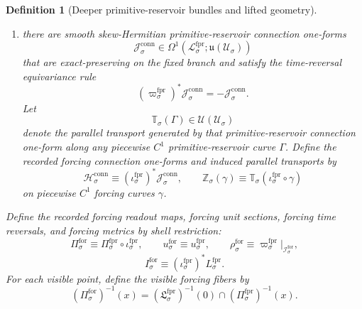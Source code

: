 \documentclass[11pt]{article}
\newcommand{\LieU}{\mathfrak u}
\newcommand{\RootClass}[1]{\mathscr U_{#1}}
\newcommand{\ForSpace}[1]{\mathcal I_{#1}^{\mathrm{for}}}
\newcommand{\ForRead}[1]{\Pi_{#1}^{\mathrm{for}}}
\newcommand{\ForUnit}[1]{u_{#1}^{\mathrm{for}}}
\newcommand{\ForTimeRev}[1]{\rho_{#1}^{\mathrm{for}}}
\newcommand{\ForMetric}[1]{I_{#1}^{\mathrm{for}}}
\newcommand{\ForLiouville}[1]{\boldsymbol{\Lambda}_{#1}^{\mathrm{for}}}
\newcommand{\ForTwo}[1]{\boldsymbol{\Xi}_{#1}^{\mathrm{for}}}
\newcommand{\ForConnectionForm}[1]{\mathcal H_{#1}^{\mathrm{conn}}}
\newcommand{\ForTransport}[1]{\mathbb Z_{#1}}
\newcommand{\ForPrimSpace}[1]{\mathcal L_{#1}^{\mathrm{fpr}}}
\newcommand{\ForPrimRead}[1]{\Pi_{#1}^{\mathrm{fpr}}}
\newcommand{\ForPrimUnit}[1]{u_{#1}^{\mathrm{fpr}}}
\newcommand{\ForPrimTimeRev}[1]{\varpi_{#1}^{\mathrm{fpr}}}
\newcommand{\ForPrimMetric}[1]{L_{#1}^{\mathrm{fpr}}}
\newcommand{\ForPrimSection}[1]{\mathfrak L_{#1}^{\mathrm{fpr}}}
\newcommand{\ForPrimInc}[1]{\iota_{#1}^{\mathrm{fpr}}}
\newcommand{\ForPrimLiouville}[1]{\boldsymbol{\Lambda}_{#1}^{\mathrm{fpr}}}
\newcommand{\ForPrimTwo}[1]{\boldsymbol{\Xi}_{#1}^{\mathrm{fpr}}}
\newcommand{\ForPrimConnectionForm}[1]{\mathcal J_{#1}^{\mathrm{conn}}}
\newcommand{\ForPrimTransport}[1]{\mathbb T_{#1}}
\newtheorem{definition}{Definition}
\begin{document}
\begin{definition}[Deeper primitive-reservoir bundles and lifted geometry]
\begin{enumerate}
\begin{equation}
    \label{eq:primitive_reservoir_liouville}
    \end{equation}
    Assume
    \[
    (\ForPrimTimeRev{\sigma})^*\ForPrimLiouville{\sigma}=-\ForPrimLiouville{\sigma}.
    \]
    Define the recorded forcing Liouville one-forms and closed two-forms by shell restriction:
    \begin{equation}
    \ForLiouville{\sigma}\equiv (\ForPrimInc{\sigma})^*\ForPrimLiouville{\sigma},
    \qquad
    \ForTwo{\sigma}\equiv (\ForPrimInc{\sigma})^*\ForPrimTwo{\sigma}.
    \label{eq:forcing_liouville_from_reservoir}
    \end{equation}
    \item there are smooth skew-Hermitian primitive-reservoir connection one-forms
    \[
    \ForPrimConnectionForm{\sigma}\in \Omega^1(\ForPrimSpace{\sigma};\LieU(\RootClass{\sigma}))
    \]
    that are exact-preserving on the fixed branch and satisfy the time-reversal equivariance rule
    \[
    (\ForPrimTimeRev{\sigma})^*\ForPrimConnectionForm{\sigma}=-\ForPrimConnectionForm{\sigma}.
    \]
    Let
    \[
    \ForPrimTransport{\sigma}(\Gamma)\in \mathcal U(\RootClass{\sigma})
    \]
    denote the parallel transport generated by that primitive-reservoir connection one-form along any piecewise \(C^1\) primitive-reservoir curve \(\Gamma\). Define the recorded forcing connection one-forms and induced parallel transports by
    \begin{equation}
    \ForConnectionForm{\sigma}\equiv (\ForPrimInc{\sigma})^*\ForPrimConnectionForm{\sigma},
    \qquad
    \ForTransport{\sigma}(\gamma)\equiv \ForPrimTransport{\sigma}(\ForPrimInc{\sigma}\circ\gamma)
    \label{eq:forcing_connection_from_reservoir}
    \end{equation}
    on piecewise \(C^1\) forcing curves \(\gamma\).
\end{enumerate}

Define the recorded forcing readout maps, forcing unit sections, forcing time reversals, and forcing metrics by shell restriction:
\begin{equation}
\ForRead{\sigma}\equiv \ForPrimRead{\sigma}\circ\ForPrimInc{\sigma},
\qquad
\ForUnit{\sigma}\equiv \ForPrimUnit{\sigma},
\qquad
\ForTimeRev{\sigma}\equiv \ForPrimTimeRev{\sigma}|_{\ForSpace{\sigma}},
\label{eq:forcing_basic_structure_from_reservoir}
\end{equation}
\begin{equation}
\ForMetric{\sigma}\equiv (\ForPrimInc{\sigma})^*\ForPrimMetric{\sigma}.
\label{eq:forcing_metric_from_reservoir}
\end{equation}
For each visible point, define the visible forcing fibers by
\begin{equation}
(\ForRead{\sigma})^{-1}(x)
=
\left(\ForPrimSection{\sigma}\right)^{-1}(0)\cap(\ForPrimRead{\sigma})^{-1}(x).
\label{eq:forcing_fiber_from_reservoir}
\end{equation}
\end{definition}
\end{document}
